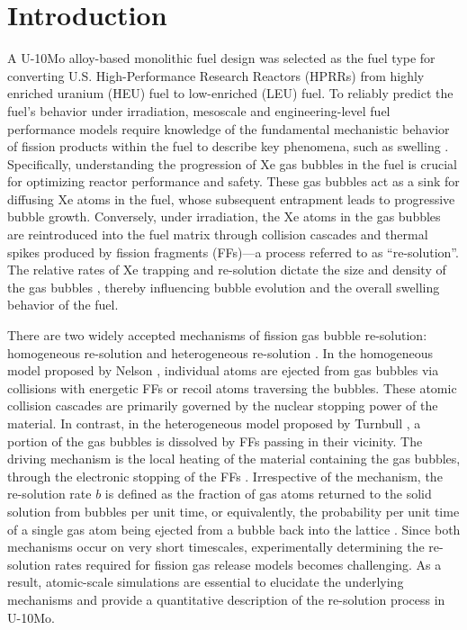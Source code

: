 \documentclass[review]{elsarticle}
\begin{document}
\section{Introduction}

A U-10Mo alloy-based monolithic fuel design was selected as the fuel type for converting U.S. High-Performance Research Reactors (HPRRs) \cite{meyer2014} from highly enriched uranium (HEU) fuel to low-enriched (LEU) fuel. To reliably predict the fuel's behavior under irradiation, mesoscale and engineering-level fuel performance models require knowledge of the fundamental mechanistic behavior of fission products within the fuel to describe key phenomena, such as swelling \cite{beeler2018gb, annualreport2021}. Specifically, understanding the progression of Xe gas bubbles in the fuel is crucial for optimizing reactor performance and safety. These gas bubbles act as a sink for diffusing Xe atoms in the fuel, whose subsequent entrapment leads to progressive bubble growth. Conversely, under irradiation, the Xe atoms in the gas bubbles are reintroduced into the fuel matrix through collision cascades and thermal spikes produced by fission fragments (FFs)---a process referred to as ``re-solution''. The relative rates of Xe trapping and re-solution dictate the size and density of the gas bubbles \cite{ye2023, olander2006re, parfitt2008}, thereby influencing bubble evolution and the overall swelling behavior of the fuel.

There are two widely accepted mechanisms of fission gas bubble re-solution: homogeneous re-solution and heterogeneous re-solution \cite{olander2006re}. In the homogeneous model proposed by Nelson \cite{nelson1969}, individual atoms are ejected from gas bubbles via collisions with energetic FFs or recoil atoms traversing the bubbles. These atomic collision cascades are primarily governed by the nuclear stopping power of the material. In contrast, in the heterogeneous model proposed by Turnbull \cite{turnbull1971}, a portion of the gas bubbles is dissolved by FFs passing in their vicinity. The driving mechanism is the local heating of the material containing the gas bubbles, through the electronic stopping of the FFs \cite{setyawan2018}. Irrespective of the mechanism, the re-solution rate $b$ is defined as the fraction of gas atoms returned to the solid solution from bubbles per unit time, or equivalently, the probability per unit time of a single gas atom being ejected from a bubble back into the lattice \cite{olander2006re, setyawan2018}. Since both mechanisms occur on very short timescales, experimentally determining the re-solution rates required for fission gas release models becomes challenging. As a result, atomic-scale simulations are essential to elucidate the underlying mechanisms and provide a quantitative description of the re-solution process in U-10Mo.
\end{document}
